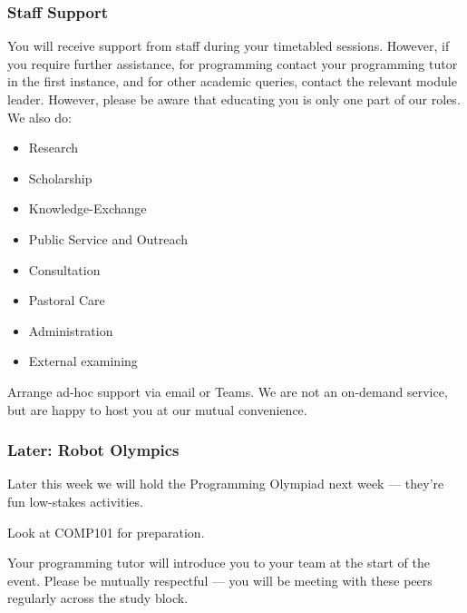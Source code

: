 
\begin{frame}
	\frametitle{Staff Support}
	
	You will receive support from staff during your timetabled sessions. However, if you require further assistance, for programming contact your programming tutor in the first instance, and for other academic queries, contact the relevant module leader. However, please be aware that educating you is only one part of our roles. We also do: 
	
	\begin{itemize}
		\item Research
		\item Scholarship
		\item Knowledge-Exchange
		\item Public Service and Outreach
		\item Consultation
		\item Pastoral Care
		\item Administration
		\item External examining
	\end{itemize}	
	
	Arrange ad-hoc support via email or Teams. We are not an on-demand service, but are happy to host you at our mutual convenience.
	
\end{frame}

\begin{frame}
	\frametitle{Later: Robot Olympics}
	
	Later this week we will hold the Programming Olympiad next week --- they're fun low-stakes activities.
	
	\vspace{1em}
	
	 Look at COMP101 for preparation. 
	
	\vspace{1em}
	
	Your programming tutor will introduce you to your team at the start of the event. Please be mutually respectful  --- you will be meeting with these peers regularly across the study block.
\end{frame}

